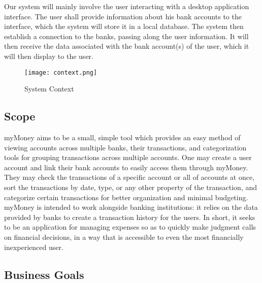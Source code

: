 \documentclass[11pt]{article}
\newcounter{use case ID}
\newcounter{req ID}
\begin{document}
Our system will mainly involve the user interacting with a desktop application interface. The user shall provide information about his bank accounts to the interface, which the system will store it in a local database. The system then establish a connection to the banks, passing along the user information. It will then receive the data associated with the bank account(s) of the user, which it will then display to the user.

\begin{figure}[htbp]
\texttt{[image: context.png]}
\caption{System Context}
\label{fig:system-context}
\end{figure}


\subsection{Scope}
myMoney aims to be a small, simple tool which provides an easy method of viewing accounts across multiple banks, their transactions, and categorization tools for grouping transactions across multiple accounts. One may create a user account and link their bank accounts to easily access them through myMoney. They may check the transactions of a specific account or all of accounts at once, sort the transactions by date, type, or any other property of the transaction, and categorize certain transactions for better organization and minimal budgeting. myMoney is intended to work alongside banking institutions: it relies on the data provided by banks to create a transaction history for the users. In short, it seeks to be an application for managing expenses so as to quickly make judgment calls on financial decisions, in a way that is accessible to even the most financially inexperienced user.

\subsection{Business Goals}
\end{document}
